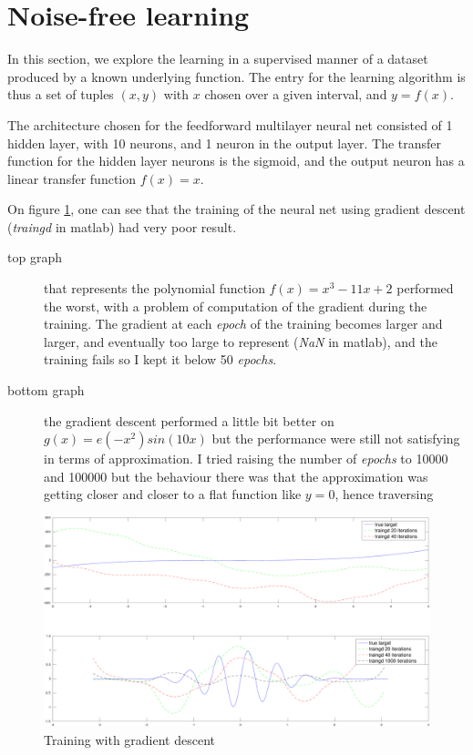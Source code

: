 \documentclass[11pt, a4paper]{article}
\begin{document}
\section{Noise-free learning}
In this section, we explore the learning in a supervised manner of a
dataset produced by a known underlying function. The entry for the
learning algorithm is thus a set of tuples $(x, y)$ with $x$ chosen
over a given interval, and $y=f(x)$.

The architecture chosen for the feedforward multilayer neural net
consisted of 1 hidden layer, with 10 neurons, and 1 neuron in the
output layer. The transfer function for the hidden layer neurons is
the sigmoid, and the output neuron has a linear transfer function
$f(x)=x$. 

On figure \ref{fig:traingd}, one can see that the training of the
neural net using gradient descent (\emph{traingd} in matlab) had very
poor result. 

\begin{description}
\item [top graph] that represents the polynomial function
  $f(x)=x^3-11x+2$ performed the worst, with a problem of computation
  of the gradient during the training. The gradient at each
  \emph{epoch} of the training becomes larger and larger, and
  eventually too large to represent (\emph{NaN} in matlab), and the
  training fails so I kept it below 50 \emph{epochs}.
\item [bottom graph] the gradient descent performed a little bit
  better on $g(x)=e(-x^2)sin(10x)$ but the performance were still not
  satisfying in terms of approximation. I tried raising the number of
  \emph{epochs} to 10000 and 100000 but the behaviour there was that
  the approximation was getting closer and closer to a flat function
  like $y = 0$, hence traversing 
\end{description}

\begin{figure}[H]
  \includegraphics[scale=.43]{traingd.pdf}
  \caption{Training with gradient descent}
  \label{fig:traingd}
\end{figure}
\end{document}
